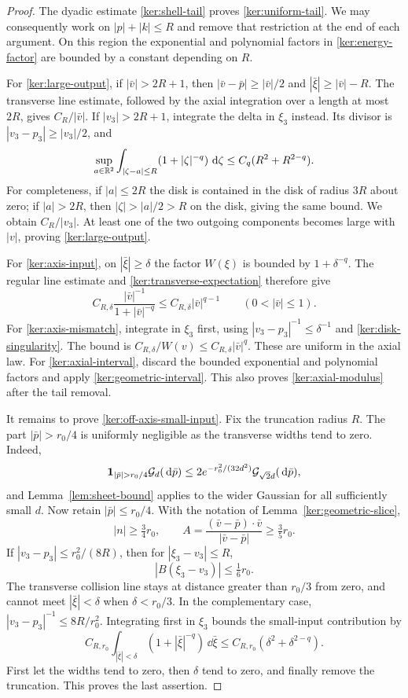 \begin{proof}
The dyadic estimate \eqref{ker:shell-tail} proves
\eqref{ker:uniform-tail}. We may consequently work on
$|p|+|k|\leq R$ and remove that restriction at the end of each
argument. On this region the exponential and polynomial factors in
\eqref{ker:energy-factor} are bounded by a constant depending on $R$.

For \eqref{ker:large-output}, if $|\bar v|>2R+1$, then
$|\bar v-\bar p|\geq|\bar v|/2$ and
$|\bar\xi|\geq|\bar v|-R$. The transverse line estimate, followed
by the axial integration over a length at most $2R$, gives
$C_R/|\bar v|$. If $|v_3|>2R+1$, integrate the delta in $\xi_3$
instead. Its divisor is $|v_3-p_3|\geq|v_3|/2$, and
\begin{equation}\label{ker:disk-singularity}
 \sup_{a\in\mathbb R^2}\int_{|\zeta-a|\leq R}
       (1+|\zeta|^{-q})\,\,\mathrm d\zeta
 \leq C_q(R^2+R^{2-q}).
\end{equation}
For completeness, if $|a|\leq2R$ the disk is contained in the disk
of radius $3R$ about zero; if $|a|>2R$, then $|\zeta|>|a|/2>R$ on
the disk, giving the same bound. We obtain $C_R/|v_3|$. At least one
of the two outgoing components becomes large with $|v|$, proving
\eqref{ker:large-output}.

For \eqref{ker:axis-input}, on $|\bar\xi|\geq\delta$ the factor
$W(\xi)$ is bounded by $1+\delta^{-q}$. The regular line estimate
and \eqref{ker:transverse-expectation} therefore give
\[
 C_{R,\delta}\frac{|\bar v|^{-1}}{1+|\bar v|^{-q}}
 \leq C_{R,\delta}|\bar v|^{q-1}
 \qquad(0<|\bar v|\leq1).
\]
For \eqref{ker:axis-mismatch}, integrate in $\xi_3$ first, using
$|v_3-p_3|^{-1}\leq\delta^{-1}$ and
\eqref{ker:disk-singularity}. The bound is
$C_{R,\delta}/W(v)\leq C_{R,\delta}|\bar v|^q$.
These are uniform in the axial law. For
\eqref{ker:axial-interval}, discard the bounded exponential and
polynomial factors and apply
\eqref{ker:geometric-interval}. This also proves
\eqref{ker:axial-modulus} after the tail removal.

It remains to prove \eqref{ker:off-axis-small-input}. Fix the
truncation radius $R$. The part $|\bar p|>r_0/4$ is uniformly
negligible as the transverse widths tend to zero. Indeed,
\[
 \ind_{|\bar p|>r_0/4}\mathcal G_d(\dd\bar p)
 \leq2e^{-r_0^2/(32d^2)}\mathcal G_{\sqrt2d}(\dd\bar p),
\]
and Lemma~\ref{lem:sheet-bound} applies to the wider Gaussian for
all sufficiently small $d$. Now retain $|\bar p|\leq r_0/4$.
With the notation of Lemma~\ref{ker:geometric-slice},
\[
 |n|\geq\tfrac34r_0,\qquad
 A=\frac{(\bar v-\bar p)\cdot\bar v}{|\bar v-\bar p|}
     \geq\tfrac35r_0.
\]
If $|v_3-p_3|\leq r_0^2/(8R)$, then for
$|\xi_3-v_3|\leq R$,
\[
 |B(\xi_3-v_3)|\leq\tfrac16r_0.
\]
The transverse collision line stays at distance greater than
$r_0/3$ from zero, and cannot meet $|\bar\xi|<\delta$ when
$\delta<r_0/3$. In the complementary case,
$|v_3-p_3|^{-1}\leq8R/r_0^2$. Integrating first in $\xi_3$ bounds
the small-input contribution by
\[
 C_{R,r_0}\int_{|\bar\xi|<\delta}
               (1+|\bar\xi|^{-q})\,\dd\bar\xi
 \leq C_{R,r_0}(\delta^2+\delta^{2-q}).
\]
First let the widths tend to zero, then $\delta$ tend to zero, and
finally remove the truncation. This proves the last assertion.
\end{proof}

